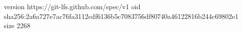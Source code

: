 version https://git-lfs.github.com/spec/v1
oid sha256:2a6a727e7ac76fa3112cdf6136b5c7083756df80740a46122816b244c69802e1
size 2268
